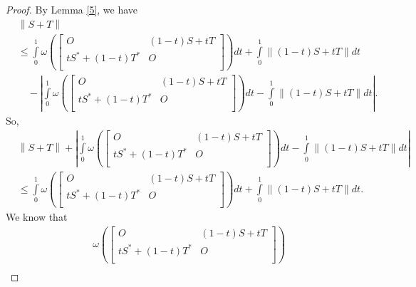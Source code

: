 \documentclass[10pt,a4paper]{amsart}
\begin{document}
\begin{proof}
By Lemma \ref{5}, we have
\[\begin{aligned}
  & \left\| S+T \right\| \\ 
 & \le \int\limits_{0}^{1}{\omega \left( \left[ \begin{matrix}
   O & \left( 1-t \right)S+tT  \\
   t{{S}^{*}}+\left( 1-t \right){{T}^{*}} & O  \\
\end{matrix} \right] \right)dt}+\int\limits_{0}^{1}{\left\| \left( 1-t \right)S+tT \right\|dt} \\ 
 &\quad -\left| \int\limits_{0}^{1}{\omega \left( \left[ \begin{matrix}
   O & \left( 1-t \right)S+tT  \\
   t{{S}^{*}}+\left( 1-t \right){{T}^{*}} & O  \\
\end{matrix} \right] \right)dt}-\int\limits_{0}^{1}{\left\| \left( 1-t \right)S+tT \right\|dt} \right|.
\end{aligned}\]
So,
\begin{equation}\label{7}
\begin{aligned}
  & \left\| S+T \right\|+\left| \int\limits_{0}^{1}{\omega \left( \left[ \begin{matrix}
   O & \left( 1-t \right)S+tT  \\
   t{{S}^{*}}+\left( 1-t \right){{T}^{*}} & O  \\
\end{matrix} \right] \right)dt}-\int\limits_{0}^{1}{\left\| \left( 1-t \right)S+tT \right\|dt} \right| \\ 
 & \le \int\limits_{0}^{1}{\omega \left( \left[ \begin{matrix}
   O & \left( 1-t \right)S+tT  \\
   t{{S}^{*}}+\left( 1-t \right){{T}^{*}} & O  \\
\end{matrix} \right] \right)dt}+\int\limits_{0}^{1}{\left\| \left( 1-t \right)S+tT \right\|dt}. 
\end{aligned}
\end{equation}
We know that
\[\begin{aligned}
  & \omega \left( \left[ \begin{matrix}
   O & \left( 1-t \right)S+tT  \\
   t{{S}^{*}}+\left( 1-t \right){{T}^{*}} & O  \\
\end{matrix} \right] \right) \\ 

\end{aligned}\]
\end{proof}
\end{document}
